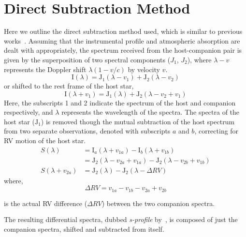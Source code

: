 \documentclass[fleqn,usenatbib]{mnras}
\begin{document}
    \section{Direct Subtraction Method}
    \label{appendix:A1}
    Here we outline the direct subtraction method used, which is similar to previous works~\citep{ferluga_separating_1997,kostogryz_spectral_2013}. Assuming that the instrumental profile and atmospheric absorption are dealt with appropriately, the spectrum received from the host-companion pair is given by the superposition of two spectral components (\(J_{1}\), \(J_{2}\)), where \(\lambda-v\) represents the Doppler shift \(\lambda(1-v/c)\) by velocity \(v\).
    \begin{equation}
    \textrm{I}(\lambda) = \textrm{J}_{1}(\lambda - v_{1}) + \textrm{J}_{2}(\lambda - v_{2})
    \end{equation}
    or shifted to the rest frame of the host star,
    \begin{equation}
    \textrm{I}(\lambda + v_{1}) = \textrm{J}_{1}(\lambda) + \textrm{J}_{2}(\lambda - v_{2} + v_{1})
    \end{equation}
    Here, the subscripts 1 and 2 indicate the spectrum of the host and companion respectively, and \(\lambda\) represents the wavelength of the spectra.
    The spectra of the host star (\(\textrm{J}_{1}\)) is removed though the mutual subtraction of the host spectrum from two separate observations, denoted with subscripts \(a\) and \(b\), correcting for RV motion of the host star.
    \begin{align}
    S(\lambda) &= \textrm{I}_{a}(\lambda + v_{1a}) - \textrm{I}_{b}(\lambda + v_{1b}) \nonumber \\
    &= \textrm{J}_{2}(\lambda - v_{2a} + v_{1a}) - \textrm{J}_{2}(\lambda - v_{2b} + v_{1b}) \nonumber \\
    S(\lambda + v_{2a}) &= \textrm{J}_{2}(\lambda) - \textrm{J}_{2}(\lambda - \Delta RV ) \label{eqn:sprofile}
    \end{align}
    where,
    \begin{equation}
    \Delta RV = v_{1a} - v_{1b} - v_{2a} + v_{2b} \label{eqn:k}
    \end{equation}

    is the actual RV difference (\(\Delta RV\)) between the two companion spectra.

    The resulting differential spectra, dubbed \emph{s-profile} by~\citet{ferluga_separating_1997}, is composed of just the companion spectra, shifted and subtracted from itself.
\end{document}
